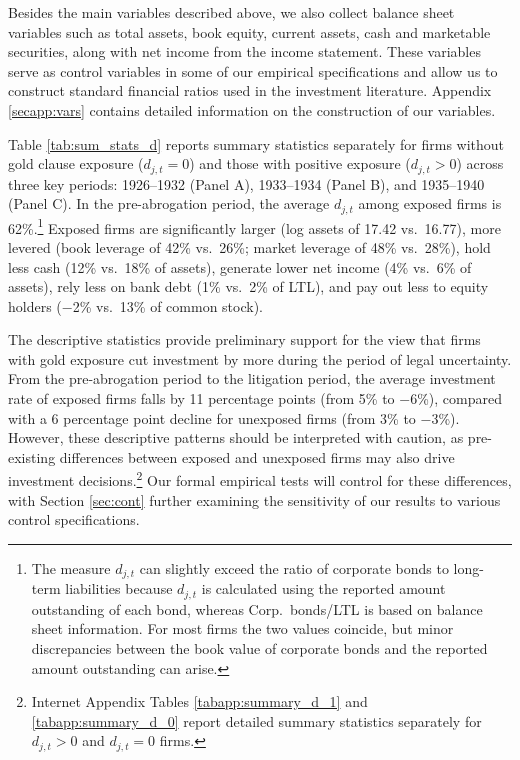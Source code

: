 Besides the main variables described above, we also collect balance sheet variables such as total assets, book equity, current assets, cash and marketable securities, along with net income from the income statement. These variables serve as control variables in some of our empirical specifications and allow us to construct standard financial ratios used in the investment literature. Appendix \ref{secapp:vars} contains detailed information on the construction of our variables.

Table \ref{tab:sum_stats_d} reports summary statistics separately for firms without gold clause exposure ($d_{j,t} = 0$) and those with positive exposure ($d_{j,t} > 0$) across three key periods: 1926--1932 (Panel A), 1933--1934 (Panel B), and 1935--1940 (Panel C). In the pre-abrogation period, the average $d_{j,t}$ among exposed firms is 62\%.\footnote{The measure $d_{j,t}$ can slightly exceed the ratio of corporate bonds to long-term liabilities because $d_{j,t}$ is calculated using the reported amount outstanding of each bond, whereas Corp.\ bonds/LTL is based on balance sheet information. For most firms the two values coincide, but minor discrepancies between the book value of corporate bonds and the reported amount outstanding can arise.} Exposed firms are significantly larger (log assets of 17.42 vs.\ 16.77), more levered (book leverage of 42\% vs.\ 26\%; market leverage of 48\% vs.\ 28\%), hold less cash (12\% vs.\ 18\% of assets), generate lower net income (4\% vs.\ 6\% of assets), rely less on bank debt (1\% vs.\ 2\% of LTL), and pay out less to equity holders ($-$2\% vs.\ 13\% of common stock).

The descriptive statistics provide preliminary support for the view that firms with gold exposure cut investment by more during the period of legal uncertainty. From the pre-abrogation period to the litigation period, the average investment rate of exposed firms falls by 11 percentage points (from 5\% to $-$6\%), compared with a 6 percentage point decline for unexposed firms (from 3\% to $-$3\%). However, these descriptive patterns should be interpreted with caution, as pre-existing differences between exposed and unexposed firms may also drive investment decisions.\footnote{Internet Appendix Tables \ref{tabapp:summary_d_1} and \ref{tabapp:summary_d_0} report detailed summary statistics separately for $d_{j,t} > 0$ and $d_{j,t} = 0$ firms.} Our formal empirical tests will control for these differences, with Section \ref{sec:cont} further examining the sensitivity of our results to various control specifications.

